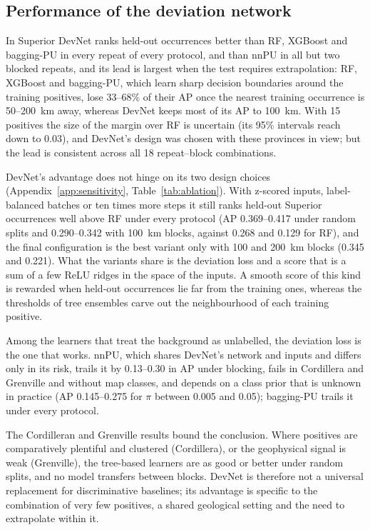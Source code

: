 \documentclass[pdflatex,sn-apa]{sn-jnl}
\begin{document}
\subsection{Performance of the deviation network}\label{sec:disc-devnet}

In Superior DevNet ranks held-out occurrences better than RF, XGBoost and bagging-PU in every repeat of every protocol, and than nnPU in all but two blocked repeats, and its lead is largest when the test requires extrapolation: RF, XGBoost and bagging-PU, which learn sharp decision boundaries around the training positives, lose 33--68\% of their AP once the nearest training occurrence is 50--200~km away, whereas DevNet keeps most of its AP to 100~km. With 15 positives the size of the margin over RF is uncertain (its 95\% intervals reach down to 0.03), and DevNet's design was chosen with these provinces in view; but the lead is consistent across all 18 repeat--block combinations.

DevNet's advantage does not hinge on its two design choices (Appendix~\ref{app:sensitivity}, Table~\ref{tab:ablation}). With z-scored inputs, label-balanced batches or ten times more steps it still ranks held-out Superior occurrences well above RF under every protocol (AP 0.369--0.417 under random splits and 0.290--0.342 with 100~km blocks, against 0.268 and 0.129 for RF), and the final configuration is the best variant only with 100 and 200~km blocks (0.345 and 0.221). What the variants share is the deviation loss and a score that is a sum of a few ReLU ridges in the space of the inputs. A smooth score of this kind is rewarded when held-out occurrences lie far from the training ones, whereas the thresholds of tree ensembles carve out the neighbourhood of each training positive.

Among the learners that treat the background as unlabelled, the deviation loss is the one that works. nnPU, which shares DevNet's network and inputs and differs only in its risk, trails it by 0.13--0.30 in AP under blocking, fails in Cordillera and Grenville and without map classes, and depends on a class prior that is unknown in practice (AP 0.145--0.275 for $\pi$ between 0.005 and 0.05); bagging-PU trails it under every protocol.

The Cordilleran and Grenville results bound the conclusion. Where positives are comparatively plentiful and clustered (Cordillera), or the geophysical signal is weak (Grenville), the tree-based learners are as good or better under random splits, and no model transfers between blocks. DevNet is therefore not a universal replacement for discriminative baselines; its advantage is specific to the combination of very few positives, a shared geological setting and the need to extrapolate within it.
\end{document}
